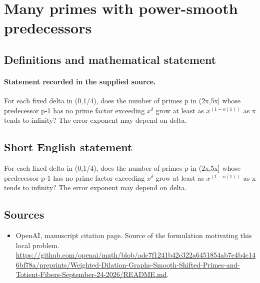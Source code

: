 \documentclass[11pt]{article}
\begin{document}
\section*{Many primes with power-smooth predecessors}\label{30007283}
\subsection{Definitions and mathematical statement}
\paragraph{Statement recorded in the supplied source.}
For each fixed delta in (0,1/4), does the number of primes p in (2x,5x] whose predecessor p-1 has no prime factor exceeding $x^\delta $ grow at least as $x^(1-o(1))$ as x tends to infinity? The error exponent may depend on delta.
\subsection{Short English statement}
For each fixed delta in (0,1/4), does the number of primes p in (2x,5x] whose predecessor p-1 has no prime factor exceeding $x^\delta $ grow at least as $x^(1-o(1))$ as x tends to infinity? The error exponent may depend on delta.
\subsection{Sources}
\begin{itemize}
\item[S1] OpenAI, manuscript citation page. Source of the formulation motivating this local problem.
\url{https://github.com/openai/math/blob/adc7f1241b42e322a6451854ab7e4b4c146bf78a/preprints/Weighted-Dilation-Graphs-Smooth-Shifted-Primes-and-Totient-Fibers-September-24-2026/README.md}.
\end{itemize}
\end{document}
